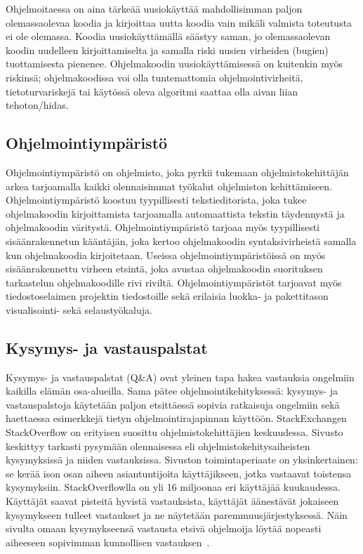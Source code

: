 \documentclass[finnish]{tktltiki2}
\theoremstyle{definition}
\theoremstyle{remark}
\begin{document}
Ohjelmoitaessa on aina tärkeää uusiokäyttää mahdollisimman paljon olemassaolevaa koodia ja kirjoittaa uutta koodia vain mikäli valmista toteutusta ei ole olemassa. Koodia uusiokäyttämällä säästyy saman, jo olemassaolevan koodin uudelleen kirjoittamiselta ja samalla riski uusien virheiden (bugien) tuottamisesta pienenee.
Ohjelmakoodin uusiokäyttämisessä on kuitenkin myös riskinsä; ohjelmakoodissa voi olla tuntemattomia ohjelmointivirheitä, tietoturvariskejä tai käytössä oleva algoritmi saattaa olla aivan liian tehoton/hidas.

\subsection{Ohjelmointiympäristö}
Ohjelmointiympäristö on ohjelmisto, joka pyrkii tukemaan ohjelmistokehittäjän arkea tarjoamalla kaikki olennaisimmat työkalut ohjelmiston kehittämiseen. Ohjelmointiympäristö koostuu tyypillisesti tekstieditorista, joka tukee ohjelmakoodin kirjoittamista tarjoamalla automaattista tekstin täydennystä ja ohjelmakoodin väritystä. Ohjelmointiympäristö tarjoaa myös tyypillisesti sisäänrakennetun kääntäjän, joka kertoo ohjelmakoodin syntaksivirheistä samalla kun ohjelmakoodia kirjoitetaan. Useissa ohjelmointiympäristöissä on myös sisäänrakennettu virheen etsintä, joka avustaa ohjelmakoodin suorituksen tarkastelun ohjelmakoodille rivi riviltä. Ohjelmointiympäristöt tarjoavat myös tiedostoselaimen projektin tiedostoille sekä erilaisia luokka- ja pakettitason visualisointi- sekä selaustyökaluja.

\subsection{Kysymys- ja vastauspalstat}
Kysymys- ja vastauspalstat (Q\&A) ovat yleinen tapa hakea vastauksia ongelmiin kaikilla elämän osa-alueilla. Sama pätee ohjelmointikehityksessä: kysymys- ja vastauspalstoja käytetään paljon etsittäessä sopivia ratkaisuja ongelmiin sekä haettaessa esimerkkejä tietyn ohjelmointirajapinnan käyttöön. StackExchangen StackOverflow on erityisen suosittu ohjelmistokehittäjien keskuudessa. Sivusto keskittyy tarkasti pysymään olennaisessa eli ohjelmistokehitysaiheisten kysymyksissä ja niiden vastauksissa. Sivuston toimintaperiaate on yksinkertainen: se kerää ison osan aiheen asiantuntijoita käyttäjikseen, jotka vastaavat toistensa kysymyksiin. StackOverflowlla on yli 16 miljoonaa eri käyttäjää kuukaudessa. Käyttäjät saavat pisteitä hyvistä vastauksista, käyttäjät äänestävät jokaiseen kysymykseen tulleet vastaukset ja ne näytetään paremmuusjärjestyksessä. Näin sivulta omaan kysymykseensä vastausta etsivä ohjelmoija löytää nopeasti aiheeseen sopivimman kunnollisen vastauksen~\cite{social-networking-meets-se}.
\end{document}
